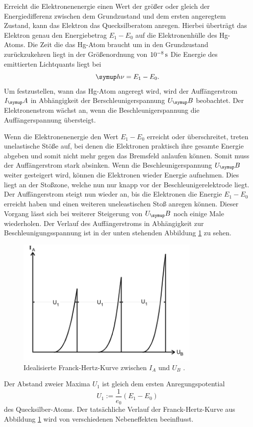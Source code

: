 Erreicht die Elektronenenergie einen Wert der größer oder gleich der
Energiedifferenz zwischen dem Grundzustand und dem ersten angeregtem Zustand,
kann das Elektron das Quecksilberatom anregen. Hierbei überträgt das Elektron
genau den Energiebetrag $E_1-E_0$ auf die Elektronenhülle des Hg-Atoms.
Die Zeit die das Hg-Atom braucht um in den Grundzustand zurückzukehren liegt
in der Größenordnung von $10^{-8}\,\si{\second}$
Die Energie des emittierten Lichtquants liegt bei
\begin{equation}
  \su{h}\nu =E_1-E_0.
\end{equation}
Um festzustellen, wann das Hg-Atom angeregt wird, wird der
Auffängerstrom $I_\su{A}$ in Abhängigkeit der Berschleunigerspannung $U_\su{B}$
beobachtet. Der Elektronenstrom wächst an, wenn die Beschleunigerspannung die
Auffängerspannung übersteigt.

Wenn die Elektronenenergie den Wert $E_1-E_0$ erreicht oder überschreitet, treten
unelastische Stöße auf, bei denen die Elektronen praktisch ihre gesamte Energie
abgeben und somit nicht mehr gegen das Bremsfeld anlaufen können.
Somit muss der Auffängerstrom stark absinken.
Wenn die Beschleunigerspannung $U_\su{B}$ weiter gesteigert wird, können die
Elektronen wieder Energie aufnehmen. Dies liegt an der Stoßzone, welche nun nur
knapp vor der Beschleunigerelektrode liegt.
Der Auffängerstrom steigt nun wieder an, bis die Elektronen die Energie $E_1-E_0$
erreicht haben und einen weiteren uneleastischen Stoß anregen können.
Dieser Vorgang lässt sich bei weiterer Steigerung von $U_\su{B}$ noch einige
Male wiederholen. Der Verlauf des Auffängerstroms in Abhängigkeit zur
Beschleunigungsspannung ist in der unten stehenden Abbildung \ref{fig:kurve} zu
sehen.
\begin{figure}
  \centering
  \includegraphics[width=0.8\textwidth]{bilder/kurve.pdf}
  \caption{Idealisierte Franck-Hertz-Kurve zwischen $I_A$ und $U_B$
  \cite{601}.}
  \label{fig:kurve}
\end{figure}
Der Abstand zweier Maxima $U_1$ ist gleich dem ersten Anregungspotential
\begin{equation*}
  U_1:=\frac{1}{e_0}(E_1-E_0)
\end{equation*}
des Quecksilber-Atoms.
Der tatsächliche Verlauf der Franck-Hertz-Kurve aus Abbildung \ref{fig:kurve}
wird von verschiedenen Nebeneffekten beeinflusst.

